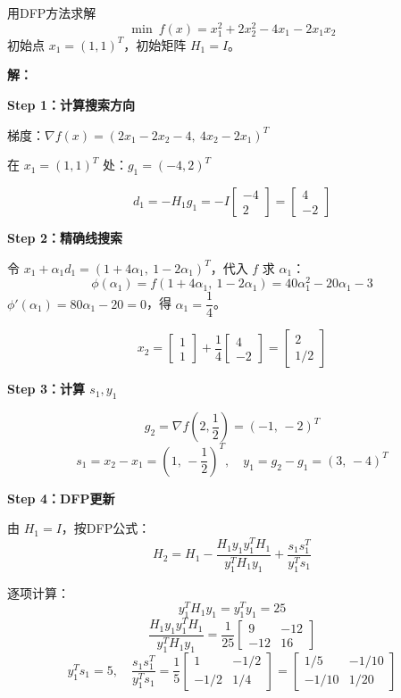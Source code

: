 \begin{example}[DFP方法]\label{ex:dfp}
用DFP方法求解
\[
\min\ f(x) = x_1^2 + 2x_2^2 - 4x_1 - 2x_1 x_2
\]
初始点 $x_1 = (1, 1)^T$，初始矩阵 $H_1 = I$。

\textbf{解：}

\textbf{Step 1：计算搜索方向}

梯度：$\nabla f(x) = (2x_1 - 2x_2 - 4,\ 4x_2 - 2x_1)^T$

在 $x_1 = (1,1)^T$ 处：$g_1 = (-4, 2)^T$

\[
d_1 = -H_1 g_1 = -I \begin{bmatrix} -4 \\ 2 \end{bmatrix} = \begin{bmatrix} 4 \\ -2 \end{bmatrix}
\]

\textbf{Step 2：精确线搜索}

令 $x_1 + \alpha_1 d_1 = (1+4\alpha_1,\ 1-2\alpha_1)^T$，代入 $f$ 求 $\alpha_1$：
\[
\phi(\alpha_1) = f(1+4\alpha_1,\ 1-2\alpha_1) = 40\alpha_1^2 - 20\alpha_1 - 3
\]
$\phi'(\alpha_1) = 80\alpha_1 - 20 = 0$，得 $\alpha_1 = \dfrac{1}{4}$。

\[
x_2 = \begin{bmatrix} 1 \\ 1 \end{bmatrix} + \frac{1}{4}\begin{bmatrix} 4 \\ -2 \end{bmatrix} = \begin{bmatrix} 2 \\ 1/2 \end{bmatrix}
\]

\textbf{Step 3：计算 $s_1, y_1$}

\[
g_2 = \nabla f\!\left(2, \frac{1}{2}\right) = (-1,\,-2)^T
\]
\[
s_1 = x_2 - x_1 = \left(1,\,-\frac{1}{2}\right)^T, \quad
y_1 = g_2 - g_1 = (3,\,-4)^T
\]

\textbf{Step 4：DFP更新}

由 $H_1 = I$，按DFP公式：
\[
H_2 = H_1 - \frac{H_1 y_1 y_1^T H_1}{y_1^T H_1 y_1} + \frac{s_1 s_1^T}{y_1^T s_1}
\]

逐项计算：
\[
y_1^T H_1 y_1 = y_1^T y_1 = 25
\]
\[
\frac{H_1 y_1 y_1^T H_1}{y_1^T H_1 y_1}
= \frac{1}{25}\begin{bmatrix} 9 & -12 \\ -12 & 16 \end{bmatrix}
\]
\[
y_1^T s_1 = 5,\quad
\frac{s_1 s_1^T}{y_1^T s_1}
= \frac{1}{5}\begin{bmatrix} 1 & -1/2 \\ -1/2 & 1/4 \end{bmatrix}
= \begin{bmatrix} 1/5 & -1/10 \\ -1/10 & 1/20 \end{bmatrix}
\]


\end{example}
